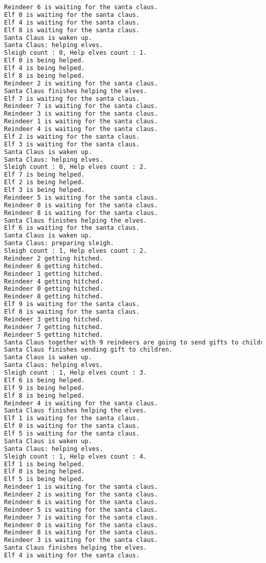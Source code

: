 \begin{lstlisting}[language=bash]
Reindeer 6 is waiting for the santa claus.
Elf 0 is waiting for the santa claus.
Elf 4 is waiting for the santa claus.
Elf 8 is waiting for the santa claus.
Santa Claus is waken up.
Santa Claus: helping elves.
Sleigh count : 0, Help elves count : 1.
Elf 0 is being helped.
Elf 4 is being helped.
Elf 8 is being helped.
Reindeer 2 is waiting for the santa claus.
Santa Claus finishes helping the elves.
Elf 7 is waiting for the santa claus.
Reindeer 7 is waiting for the santa claus.
Reindeer 3 is waiting for the santa claus.
Reindeer 1 is waiting for the santa claus.
Reindeer 4 is waiting for the santa claus.
Elf 2 is waiting for the santa claus.
Elf 3 is waiting for the santa claus.
Santa Claus is waken up.
Santa Claus: helping elves.
Sleigh count : 0, Help elves count : 2.
Elf 7 is being helped.
Elf 2 is being helped.
Elf 3 is being helped.
Reindeer 5 is waiting for the santa claus.
Reindeer 0 is waiting for the santa claus.
Reindeer 8 is waiting for the santa claus.
Santa Claus finishes helping the elves.
Elf 6 is waiting for the santa claus.
Santa Claus is waken up.
Santa Claus: preparing sleigh.
Sleigh count : 1, Help elves count : 2.
Reindeer 2 getting hitched.
Reindeer 6 getting hitched.
Reindeer 1 getting hitched.
Reindeer 4 getting hitched.
Reindeer 0 getting hitched.
Reindeer 8 getting hitched.
Elf 9 is waiting for the santa claus.
Elf 8 is waiting for the santa claus.
Reindeer 3 getting hitched.
Reindeer 7 getting hitched.
Reindeer 5 getting hitched.
Santa Claus together with 9 reindeers are going to send gifts to children around the world.
Santa Claus finishes sending gift to children.
Santa Claus is waken up.
Santa Claus: helping elves.
Sleigh count : 1, Help elves count : 3.
Elf 6 is being helped.
Elf 9 is being helped.
Elf 8 is being helped.
Reindeer 4 is waiting for the santa claus.
Santa Claus finishes helping the elves.
Elf 1 is waiting for the santa claus.
Elf 0 is waiting for the santa claus.
Elf 5 is waiting for the santa claus.
Santa Claus is waken up.
Santa Claus: helping elves.
Sleigh count : 1, Help elves count : 4.
Elf 1 is being helped.
Elf 0 is being helped.
Elf 5 is being helped.
Reindeer 1 is waiting for the santa claus.
Reindeer 2 is waiting for the santa claus.
Reindeer 6 is waiting for the santa claus.
Reindeer 5 is waiting for the santa claus.
Reindeer 7 is waiting for the santa claus.
Reindeer 0 is waiting for the santa claus.
Reindeer 8 is waiting for the santa claus.
Reindeer 3 is waiting for the santa claus.
Santa Claus finishes helping the elves.
Elf 4 is waiting for the santa claus.

\end{lstlisting}
